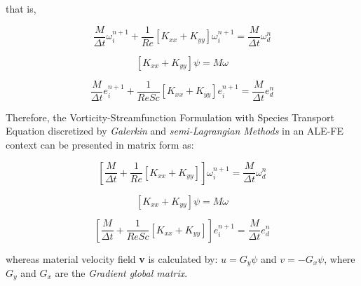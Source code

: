 \medskip
\noindent
that is,

\begin{equation}
 \frac{M}{\Delta t} \omega^{n+1}_{i}
 + \frac{1}{\textit{Re}} \left[ K_{xx} + K_{yy} \right] \omega^{n+1}_{i}
 = \frac{M}{\Delta t} \omega^{n}_{d}
\end{equation}

\begin{equation}
 \left[ K_{xx} + K_{yy} \right] \psi 
 =  M \omega
\end{equation}

\begin{equation}
 \frac{M}{\Delta t} e^{n+1}_{i}
 + \frac{1}{\textit{ReSc}} \left[ K_{xx} + K_{yy} \right] e^{n+1}_{i}
 = \frac{M}{\Delta t} e^{n}_{d}
\end{equation}


\medskip
Therefore, the Vorticity-Streamfunction Formulation with
Species Transport Equation discretized by \textit{Galerkin}
and \textit{semi-Lagrangian Methods} in an ALE-FE context
can be presented in matrix form as:

\begin{equation}
 \left[
 \frac{M}{\Delta t} 
 + \frac{1}{\textit{Re}} \left[ K_{xx} + K_{yy} \right]
 \right] 
 \omega^{n+1}_{i}
 = \frac{M}{\Delta t} \omega^{n}_{d}
\end{equation}

\begin{equation}
 \left[ K_{xx} + K_{yy} \right] \psi 
 =  M \omega
\end{equation}

\begin{equation}
 \left[
 \frac{M}{\Delta t} 
 + \frac{1}{\textit{ReSc}} \left[ K_{xx} + K_{yy} \right]
 \right] 
 e^{n+1}_{i}
 = \frac{M}{\Delta t} e^{n}_{d}
\end{equation}

\medskip
\noindent
whereas material velocity field \textbf{v} is calculated by:
$u =   G_{y} \psi$ and 
$v = - G_{x} \psi$, 
where 
$G_{y}$ and 
$G_{x}$ are the \textit{Gradient global matrix}.
 

